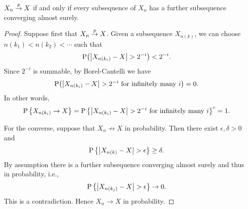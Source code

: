 \begin{theorem}\label{thm:prob_conv_subseq_as}
    $X_n\overset{p}{\to} X$ if and only if every subsequence of $X_n$ has a further subsequence 
    converging almost surely. 
\end{theorem}
\begin{proof}
    Suppose first that $X_n\overset{p}{\to} X$. Given a subsequence $X_{n(k)}$, we can 
    choose $n(k_1)<n(k_2)<\cdots$ such that 
    \begin{equation*}
        \P\pth{\abs{X_{n(k_i)}-X}>2^{-i}} < 2^{-i}. 
    \end{equation*} 
    Since $2^{-i}$ is summable, by Borel-Cantelli we have 
    \begin{equation*}
        \P\pth{\abs{X_{n(k_i)}-X}>2^{-i}\text{ for infinitely many $i$}} = 0. 
    \end{equation*}
    In other words, 
    \begin{equation*}
        \operatorname{P}\left\{ {X_{n(k_i)}\to X} \right\} = \operatorname{P}\left\{ {\left\lvert {X_{n(k_i)}-X} \right\rvert>2^{-i}\text{ for infinitely many $i$}} \right\}^c 
        = 1. 
    \end{equation*}

    For the converse, suppose that $X_n\not\to X$ in probability. Then there exist 
    $\epsilon, \delta>0$ and 
    \begin{equation*}
        \operatorname{P}\left\{ {\left\lvert {X_{n(k)} - X} \right\rvert>\epsilon} \right\} \geq \delta. 
    \end{equation*}
    By assumption there is a further subsequence converging almost surely 
    and thus in probability, i.e., 
    \begin{equation*}
        \operatorname{P}\left\{ {\left\lvert {X_{n(k_j)} - X} \right\rvert>\epsilon} \right\} \to 0.
    \end{equation*}
    This is a contradiction. Hence $X_n\to X$ in probability. 
\end{proof}

